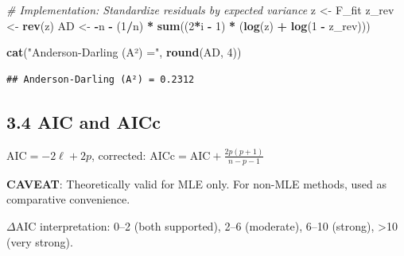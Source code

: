 \documentclass[
]{article}
\newenvironment{Shaded}{\begin{snugshade}}{\end{snugshade}}
\newcommand{\CommentTok}[1]{\textcolor[rgb]{0.56,0.35,0.01}{\textit{#1}}}
\newcommand{\DecValTok}[1]{\textcolor[rgb]{0.00,0.00,0.81}{#1}}
\newcommand{\FunctionTok}[1]{\textcolor[rgb]{0.13,0.29,0.53}{\textbf{#1}}}
\newcommand{\NormalTok}[1]{#1}
\newcommand{\OtherTok}[1]{\textcolor[rgb]{0.56,0.35,0.01}{#1}}
\newcommand{\SpecialCharTok}[1]{\textcolor[rgb]{0.81,0.36,0.00}{\textbf{#1}}}
\newcommand{\StringTok}[1]{\textcolor[rgb]{0.31,0.60,0.02}{#1}}
\begin{document}
\begin{Shaded}
\begin{Highlighting}[]
\CommentTok{\# Implementation: Standardize residuals by expected variance}
\NormalTok{z     }\OtherTok{\textless{}{-}}\NormalTok{ F\_fit}
\NormalTok{z\_rev }\OtherTok{\textless{}{-}} \FunctionTok{rev}\NormalTok{(z)}
\NormalTok{AD }\OtherTok{\textless{}{-}} \SpecialCharTok{{-}}\NormalTok{n }\SpecialCharTok{{-}} \NormalTok{(}\DecValTok{1}\SpecialCharTok{/}\NormalTok{n) }\SpecialCharTok{*} \FunctionTok{sum}\NormalTok{((}\DecValTok{2}\SpecialCharTok{*}\NormalTok{i }\SpecialCharTok{{-}} \DecValTok{1}\NormalTok{) }\SpecialCharTok{*}\NormalTok{ (}\FunctionTok{log}\NormalTok{(z) }\SpecialCharTok{+} \FunctionTok{log}\NormalTok{(}\DecValTok{1} \SpecialCharTok{{-}}\NormalTok{ z\_rev)))}

\FunctionTok{cat}\NormalTok{(}\StringTok{"Anderson{-}Darling (A²) ="}\NormalTok{, }\FunctionTok{round}\NormalTok{(AD, }\DecValTok{4}\NormalTok{))}
\end{Highlighting}
\end{Shaded}

\begin{verbatim}
## Anderson-Darling (A²) = 0.2312
\end{verbatim}

\subsection{3.4 AIC and AICc}\label{aic-and-aicc}

\(\text{AIC} = -2\ell + 2p\), corrected:
\(\text{AICc} = \text{AIC} + \frac{2p(p+1)}{n-p-1}\)

\textbf{CAVEAT}: Theoretically valid for MLE only. For non-MLE methods,
used as comparative convenience.

\(\Delta\)AIC interpretation: 0--2 (both supported), 2--6 (moderate),
6--10 (strong), \textgreater10 (very strong).
\end{document}
